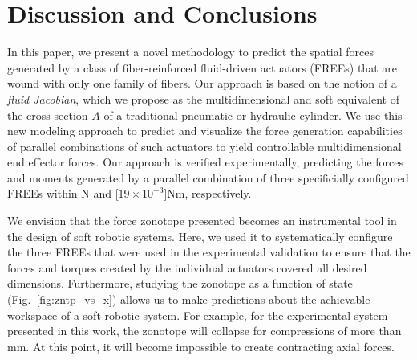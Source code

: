 \section{Discussion and Conclusions}
\label{sec:conclusion}
In this paper, we present a novel methodology to predict the spatial forces generated by a class of fiber-reinforced fluid-driven actuators (FREEs) that are wound with only one family of fibers.
Our approach is based on the notion of a \emph{fluid Jacobian}, which we propose as the multidimensional and soft equivalent of the cross section $A$ of a traditional pneumatic or hydraulic cylinder.
We use this new modeling approach to predict and visualize the force generation capabilities of parallel combinations of such actuators to yield controllable multidimensional end effector forces.
Our approach is verified experimentally, predicting the forces and moments generated by a parallel combination of three specificially configured FREEs within \unit[3]{N} and \unit[$19 \times 10^{-3}$]{Nm}, respectively.

We envision that the force zonotope presented becomes an instrumental tool in the design of soft robotic systems.
Here, we used it to systematically configure the three FREEs that were used in the experimental validation to ensure that the forces and torques created by the individual actuators covered all desired dimensions.
Furthermore, studying the zonotope as a function of state (Fig.~\ref{fig:zntp_vs_x}) allows us to make predictions about the achievable workspace of a soft robotic system.
For example, for the experimental system presented in this work, the zonotope will collapse for compressions of more than \unit[-10]{mm}.
At this point, it will become impossible to create contracting axial forces.

